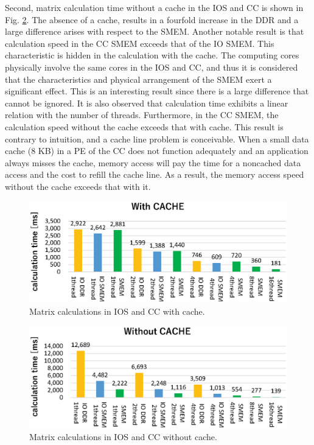Second, matrix calculation time without a cache in the IOS and CC is shown in Fig. \ref{fig:mat_calc_uncache}.
The absence of a cache, results in a fourfold increase in the DDR and a large difference arises with respect to the SMEM.
Another notable result is that calculation speed in the CC SMEM exceeds that of the IO SMEM.
This characteristic is hidden in the calculation with the cache.
The computing cores physically involve the same cores in the IOS and CC, and thus it is considered that the characteristics and physical arrangement of the SMEM exert a significant effect.
This is an interesting result since there is a large difference that cannot be ignored.
It is also observed that calculation time exhibits a linear relation with the number of threads.
Furthermore, in the CC SMEM, the calculation speed without the cache exceeds that with cache.
This result is contrary to intuition, and a cache line problem is conceivable.
When a small data cache (8 KB) in a PE of the CC does not function adequately and an application always misses the cache, memory access will pay the time for a noncached data access and the cost to refill the cache line.
As a result, the memory access speed without the cache exceeds that with it.

\clearpage

\begin{figure}[!htbp]
  \centering
  \includegraphics[width=.9\linewidth]{../figure/BarGraph_matrix_with_cache.eps}
  \caption{Matrix calculations in IOS and CC with cache.}
  \label{fig:mat_calc_cache}
\end{figure}

\begin{figure}[!htbp]
  \centering
  \includegraphics[width=.9\linewidth]{../figure/BarGraph_matrix_without_cache.eps}
  \caption{Matrix calculations in IOS and CC without cache.}
  \label{fig:mat_calc_uncache}
\end{figure}

